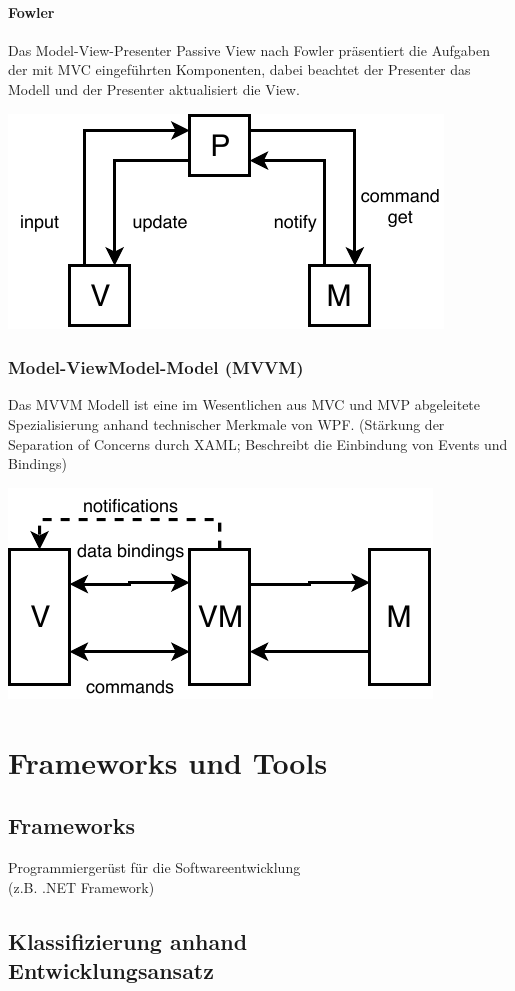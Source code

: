 \documentclass
[
	8pt,		%
	ngerman,	%
	a4paper,	%
	landscape,	%
	final		%
]{extarticle}
\begin{document}
\begin{multicols*}{4}
	\paragraph{Fowler}
	Das Model-View-Presenter Passive View nach Fowler präsentiert die Aufgaben
	der mit MVC eingeführten Komponenten, dabei beachtet der Presenter das Modell
	und der Presenter aktualisiert die View.
	\begin{center}
		\includegraphics[width=0.6\linewidth]{./Documents/Graphics/DiagramMVPFowler.pdf}
	\end{center}
	\subsubsection{Model-ViewModel-Model (MVVM)}
	Das MVVM Modell ist eine im Wesentlichen aus MVC und MVP abgeleitete
	Spezialisierung anhand technischer Merkmale von WPF.
	(Stärkung der Separation of Concerns durch XAML; Beschreibt die Einbindung
	von Events und Bindings)
	\begin{center}
		\includegraphics[width=0.6\linewidth]{./Documents/Graphics/DiagramMVVM.pdf}
	\end{center}
	\section{Frameworks und Tools}
	\subsection{Frameworks}
	Programmiergerüst für die Softwareentwicklung\\
	(z.B. .NET Framework)
	\subsection{Klassifizierung anhand\\Entwicklungsansatz}
	{
		\setlength{\columnseprule}{0pt}
		\begin{multicols*}{2}

\end{multicols*}}
\end{multicols*}
\end{document}
